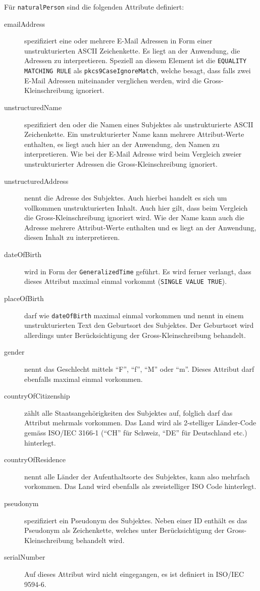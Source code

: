 \documentclass[10pt,a4paper]{article}
\begin{document}
Für \texttt{naturalPerson} sind die folgenden Attribute definiert:
\begin{description}
    \item[emailAddress] spezifiziert eine oder mehrere E-Mail Adressen in Form einer
        unstrukturierten ASCII Zeichenkette. Es liegt an der Anwendung, die Adressen zu
        interpretieren. Speziell an diesem Element ist die \texttt{EQUALITY MATCHING RULE}
        als \texttt{pkcs9CaseIgnoreMatch}, welche besagt, dass falls zwei E-Mail Adressen
        miteinander verglichen werden, wird die Gross-Kleinschreibung ignoriert.
    \item[unstructuredName] spezifiziert den oder die Namen eines Subjektes als
        unstrukturierte ASCII Zeichenkette. Ein unstrukturierter Name kann mehrere
        Attribut-Werte enthalten, es liegt auch hier an der Anwendung, den Namen zu
        interpretieren. Wie bei der E-Mail Adresse wird beim Vergleich zweier
        unstrukturierter Adressen die Gross-Kleinschreibung ignoriert.
    \item[unstructuredAddress] nennt die Adresse des Subjektes. Auch hierbei handelt es
        sich um vollkommen unstrukturierten Inhalt. Auch hier gilt, dass beim Vergleich
        die Gross-Kleinschreibung ignoriert wird. Wie der Name kann auch die Adresse
        mehrere Attribut-Werte enthalten und es liegt an der Anwendung, diesen Inhalt zu
        interpretieren.
    \item[dateOfBirth] wird in Form der \texttt{GeneralizedTime} geführt. Es wird ferner
        verlangt, dass dieses Attribut maximal einmal vorkommt (\texttt{SINGLE VALUE
        TRUE}).
    \item[placeOfBirth] darf wie \texttt{dateOfBirth} maximal einmal vorkommen und nennt
        in einem unstrukturierten Text den Geburtsort des Subjektes. Der Geburtsort wird
        allerdings unter Berücksichtigung der Gross-Kleinschreibung behandelt.
    \item[gender] nennt das Geschlecht mittels "`F"', "`f"', "`M"' oder "`m"'. Dieses
        Attribut darf ebenfalls maximal einmal vorkommen.
    \item[countryOfCitizenship] zählt alle Staatsangehörigkeiten des Subjektes auf,
        folglich darf das Attribut mehrmals vorkommen. Das Land wird als 2-stelliger
        Länder-Code gemäss ISO/IEC 3166-1 ("`CH"' für Schweiz, "`DE"' für Deutschland
        etc.) hinterlegt.
    \item[countryOfResidence] nennt alle Länder der Aufenthaltsorte des Subjektes, kann
        also mehrfach vorkommen. Das Land wird ebenfalls als zweistelliger ISO Code
        hinterlegt.
    \item[pseudonym] spezifiziert ein Pseudonym des Subjektes. Neben einer ID enthält es
        das Pseudonym als Zeichenkette, welches unter Berücksichtigung der
        Gross-Kleinschreibung behandelt wird.
    \item[serialNumber] Auf dieses Attribut wird nicht eingegangen, es ist definiert in
        ISO/IEC 9594-6.
\end{description}
\end{document}
